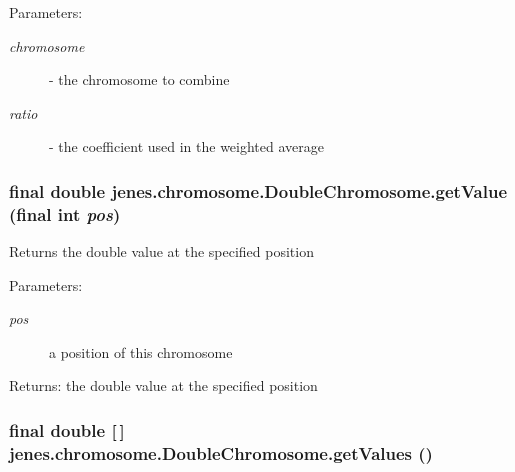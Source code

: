 \begin{Desc}
\item[Parameters:]
\begin{description}
\item[{\em chromosome}]- the chromosome to combine \item[{\em ratio}]- the coefficient used in the weighted average \end{description}
\end{Desc}
\hypertarget{classjenes_1_1chromosome_1_1_double_chromosome_cb68cbcac3e7859d4f380530355012c8}{
\subsubsection[getValue]{\setlength{\rightskip}{0pt plus 5cm}final double jenes.chromosome.DoubleChromosome.getValue (final int {\em pos})}}
\label{classjenes_1_1chromosome_1_1_double_chromosome_cb68cbcac3e7859d4f380530355012c8}


Returns the double value at the specified position 

\begin{Desc}
\item[Parameters:]
\begin{description}
\item[{\em pos}]a position of this chromosome \end{description}
\end{Desc}
\begin{Desc}
\item[Returns:]the double value at the specified position \end{Desc}
\hypertarget{classjenes_1_1chromosome_1_1_double_chromosome_3dea8e4aee9041437b101d1f74d10d1f}{
\subsubsection[getValues]{\setlength{\rightskip}{0pt plus 5cm}final double \mbox{[}$\,$\mbox{]} jenes.chromosome.DoubleChromosome.getValues ()}}
\label{classjenes_1_1chromosome_1_1_double_chromosome_3dea8e4aee9041437b101d1f74d10d1f}


